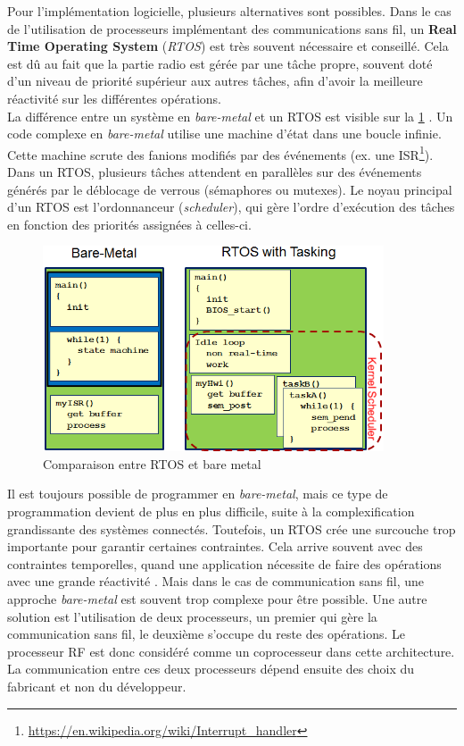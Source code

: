 Pour l'implémentation logicielle, plusieurs alternatives sont possibles. Dans le cas de l'utilisation de processeurs implémentant des communications sans fil, un \textbf{Real Time Operating System} (\textit{RTOS}) est très souvent nécessaire et conseillé. Cela est dû au fait que la partie radio est gérée par une tâche propre, souvent doté d'un niveau de priorité supérieur aux autres tâches, afin d'avoir la meilleure réactivité sur les différentes opérations.\\


La différence entre un système en \textit{bare-metal} et un RTOS est visible sur la \cref{fig-rtos_vs_baremetal} \cite{GeneralR94:online}. Un code complexe en \textit{bare-metal} utilise une machine d'état dans une boucle infinie. Cette machine scrute des fanions modifiés par des événements (ex. une ISR\footnote{\url{https://en.wikipedia.org/wiki/Interrupt_handler}}). Dans un RTOS, plusieurs tâches attendent en parallèles sur des événements générés par le déblocage de verrous (sémaphores ou mutexes). Le noyau principal d'un RTOS est l'ordonnanceur (\textit{scheduler}), qui gère l'ordre d'exécution des tâches en fonction des priorités assignées à celles-ci.
\begin{figure}[ht!]
    \centering
    \includegraphics[width=0.9\textwidth]{Figures/StateOfTheArt/rtos_vs_baremetal.png}
    \caption{Comparaison entre RTOS et bare metal}
    \label{fig-rtos_vs_baremetal}
\end{figure}



Il est toujours possible de programmer en \textit{bare-metal}, mais ce type de programmation devient de plus en plus difficile, suite à la complexification grandissante des systèmes connectés. Toutefois, un RTOS crée une surcouche trop importante pour garantir certaines contraintes. Cela arrive souvent avec des contraintes temporelles, quand une application nécessite de faire des opérations avec une grande réactivité \cite{Baremeta22:online}. Mais dans le cas de communication sans fil, une approche \textit{bare-metal} est souvent trop complexe pour être possible. Une autre solution est l'utilisation de deux processeurs, un premier qui gère la communication sans fil, le deuxième s'occupe du reste des opérations. Le processeur RF est donc considéré comme un coprocesseur dans cette architecture. La communication entre ces deux processeurs dépend ensuite des choix du fabricant et non du développeur. 


